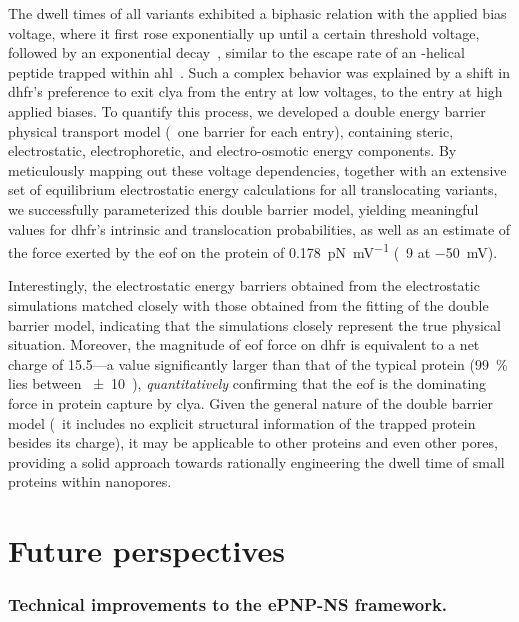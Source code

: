 The dwell times of all \DHFRt{} variants exhibited a biphasic relation with the applied bias voltage, where it
first rose exponentially up until a certain threshold voltage, followed by an exponential
decay~\cite{Biesemans-2015}, similar to the escape rate of an \ta-helical peptide trapped within
\gls{ahl}~\cite{Movileanu-2005}. Such a complex behavior was explained by a shift in \gls{dhfr}'s preference
to exit \gls{clya} from the \cisi{} entry at low voltages, to the \transi{} entry at high applied biases. To
quantify this process, we developed a double energy barrier physical transport model (\ie~one barrier for each
entry), containing steric, electrostatic, electrophoretic, and electro-osmotic energy components. By
meticulously mapping out these voltage dependencies, together with an extensive set of equilibrium
electrostatic energy calculations for all translocating \DHFRt{} variants, we successfully parameterized this
double barrier model, yielding meaningful values for \gls{dhfr}'s intrinsic \cisi{} and \transi{}
translocation probabilities, as well as an estimate of the force exerted by the \gls{eof} on the protein of
\SI{0.178}{\pico\newton\per\milli\volt} (\eg~\SI{9}{\pN} at \SI{-50}{\mV}).

Interestingly, the electrostatic energy barriers obtained from the electrostatic simulations matched closely
with those obtained from the fitting of the double barrier model, indicating that the simulations closely
represent the true physical situation. Moreover, the magnitude of \gls{eof} force on \gls{dhfr} is equivalent
to a net charge of \SI{+15.5}{\ec}---a value significantly larger than that of the typical protein
(\SI{99}{\percent} lies between \SI{\pm10}{\ec}~\cite{Requiao-2017}), \emph{quantitatively} confirming that
the \gls{eof} is the dominating force in protein capture by \gls{clya}. Given the general nature of the double
barrier model (\ie~it includes no explicit structural information of the trapped protein besides its charge),
it may be applicable to other proteins and even other pores, providing a solid approach towards rationally
engineering the dwell time of small proteins within nanopores.



%
\section{Future perspectives}
%
\label{sec:con:perspectives}
%

\subsubsection{Technical improvements to the {ePNP-NS} framework.}
%

